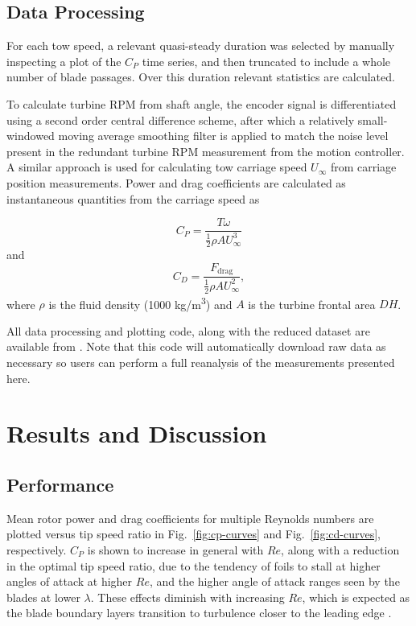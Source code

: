 \documentclass[10pt,letterpaper]{article}
\begin{document}
\subsection*{Data Processing}

For each tow speed, a relevant quasi-steady duration was selected by manually
inspecting a plot of the $C_P$ time series, and then truncated to include a
whole number of blade passages. Over this duration relevant statistics are
calculated.

To calculate turbine RPM from shaft angle, the encoder signal is differentiated
using a second order central difference scheme, after which a relatively
small-windowed moving average smoothing filter is applied to match the noise
level present in the redundant turbine RPM measurement from the motion
controller. A similar approach is used for calculating tow carriage speed
$U_\infty$ from carriage position measurements. Power and drag coefficients are
calculated as instantaneous quantities from the carriage speed as

\begin{equation}
    C_P = \frac{T \omega}{\frac{1}{2} \rho A U_\infty^3}
\end{equation}
and
\begin{equation}
    C_D = \frac{F_\mathrm{drag}}{\frac{1}{2} \rho A U_\infty^2},
\end{equation}
where $\rho$ is the fluid density (1000 kg/m\textsuperscript{3}) and $A$ is
the turbine frontal area $DH$.

All data processing and plotting code, along with the reduced dataset are
available from \cite{Bachant2015-RM2-data}. Note that this code will
automatically download raw data as necessary so users can perform a full
reanalysis of the measurements presented here.


\section*{Results and Discussion}

\subsection*{Performance}

Mean rotor power and drag coefficients for multiple Reynolds numbers are plotted
versus tip speed ratio in Fig.~\ref{fig:cp-curves} and Fig.~\ref{fig:cd-curves},
respectively. $C_P$ is shown to increase in general with $Re$, along with a
reduction in the optimal tip speed ratio, due to the tendency of foils to stall
at higher angles of attack at higher $Re$, and the higher angle of attack ranges
seen by the blades at lower $\lambda$. These effects diminish with increasing
$Re$, which is expected as the blade boundary layers transition to turbulence
closer to the leading edge \cite{Lissaman1983, Bachant2015-RVAT-Re-dep}.
\end{document}

